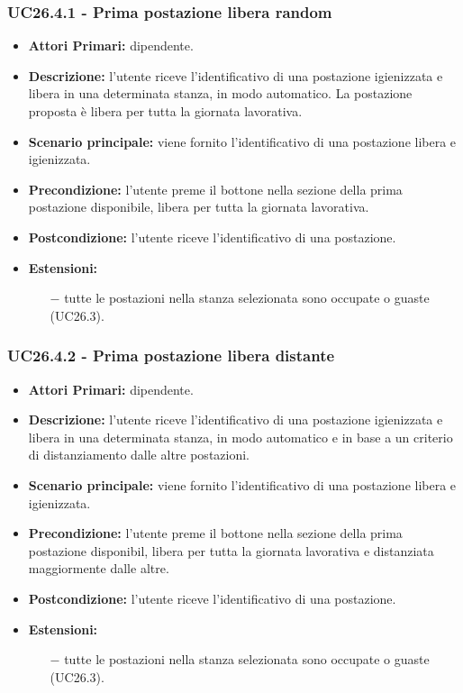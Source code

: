 \subsubsection{ UC26.4.1 - Prima postazione libera random}
\begin{itemize}
	\item\textbf{Attori Primari:} dipendente.
	\item\textbf{Descrizione:} l’utente riceve l'identificativo di una postazione igienizzata e libera in una determinata stanza, 
	in modo automatico. La postazione proposta è libera per tutta la giornata lavorativa.
	\item\textbf{Scenario principale:} viene fornito l'identificativo di una postazione libera e igienizzata.
	\item\textbf{Precondizione:} l’utente preme il bottone nella sezione della prima postazione disponibile, libera per tutta la giornata lavorativa.
	\item\textbf{Postcondizione:} l’utente riceve l'identificativo di una postazione.
	\item\textbf{Estensioni:}
	\begin{itemize}
		\item[$-$] tutte le postazioni nella stanza selezionata sono occupate o guaste (UC26.3).
	\end{itemize}
\end{itemize}
\subsubsection{ UC26.4.2 - Prima postazione libera distante}
\begin{itemize}
	\item\textbf{Attori Primari:} dipendente.
	\item\textbf{Descrizione:} l’utente riceve l'identificativo di una postazione igienizzata e libera in una determinata stanza, 
	in modo automatico e in base a un criterio di distanziamento dalle altre postazioni.
	\item\textbf{Scenario principale:} viene fornito l'identificativo di una postazione libera e igienizzata.
	\item\textbf{Precondizione:} l’utente preme il bottone nella sezione della prima postazione disponibil, libera per tutta la giornata lavorativa e distanziata maggiormente dalle altre.
	\item\textbf{Postcondizione:} l’utente riceve l'identificativo di una postazione.
	\item\textbf{Estensioni:}
	\begin{itemize}
		\item[$-$] tutte le postazioni nella stanza selezionata sono occupate o guaste (UC26.3).
	\end{itemize}
\end{itemize}
